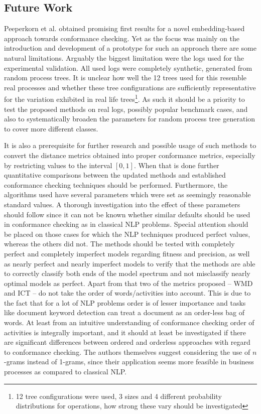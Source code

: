 \documentclass[runningheads]{template/llncs}
\begin{document}
\subsection{Future Work}
Peeperkorn et al. obtained promising first results for a novel embedding-based approach towards conformance checking.
Yet as the focus was mainly on the introduction and development of a prototype for such an approach there are some natural limitations.
Arguably the biggest limitation were the logs used for the experimental validation.
All used logs were completely synthetic, generated from random process trees.
It is unclear how well the 12 trees used for this resemble real processes and whether these tree configurations are sufficiently representative for the variation exhibited in real life trees\footnote{12 tree configurations were used, 3 sizes and 4 different probability distributions for operations, how strong these vary should be investigated}.
As such it should be a priority to test the proposed methods on real logs, possibly popular benchmark cases, and also to systematically broaden the parameters for random process tree generation to cover more different classes.

\color{blue}
It is also a  prerequisite for further research and possible usage of such methods to convert the distance metrics obtained into proper conformance metrics, especially by restricting values to the interval $[0,1]$.
When that is done further quantitative comparisons between the updated methods and established conformance checking techniques should be performed.
Furthermore, the algorithms used have several parameters which were set as seemingly reasonable standard values.
A thorough investigation into the effect of these parameters should follow since it can not be known whether similar defaults should be used in conformance checking  as in classical NLP problems.
Special attention should be placed on those cases for which the NLP techniques produced perfect values, whereas the others did not.
The methods should be tested with completely perfect and completely imperfect models regarding fitness and precision, as well as nearly perfect and nearly imperfect models to verify that the methods are able to correctly classify both ends of the model spectrum and not misclassify nearly optimal models as perfect.
\color{black}
Apart from that two of the metrics proposed -- WMD and ICT -- do not take the order of words/activities into account.
This is due to the fact that for a lot of NLP problems order is of lesser importance and tasks like document keyword detection can treat a document as an order-less bag of words.
At least from an intuitive understanding of conformance checking order of activities is integrally important, and it should at least be investigated if there are significant differences between ordered and orderless approaches with regard to conformance checking.
The authors themselves suggest considering the use of $n$-grams instead of 1-grams, since their application seems more feasible in business processes as compared to classical NLP.
\end{document}
